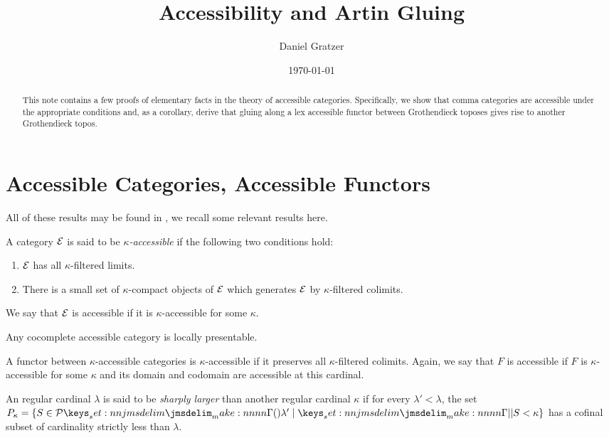\documentclass{amsart}
\title{Accessibility and Artin Gluing}
\author{Daniel Gratzer}
\date{\today}
\begin{document}
\begin{abstract}
  This note contains a few proofs of elementary facts in the theory of accessible
  categories. Specifically, we show that comma categories are accessible under the appropriate
  conditions and, as a corollary, derive that gluing along a lex accessible functor between
  Grothendieck toposes gives rise to another Grothendieck topos.
\end{abstract}

\maketitle

\section{Accessible Categories, Accessible Functors}
\label{sec:accessible}

All of these results may be found in \textcite{adamek-rosicky:1994}, we recall some relevant
results here.

\begin{definition}
  \label{def:accessible:accessible-category}
  A category $\mathcal{E}$ is said to be \emph{$\kappa$-accessible} if the following two conditions hold:
  \begin{enumerate}
  \item $\mathcal{E}$ has all $\kappa$-filtered limits.
  \item There is a small set of $\kappa$-compact objects of $\mathcal{E}$ which generates $\mathcal{E}$ by
    $\kappa$-filtered colimits.
  \end{enumerate}
  We say that $\mathcal{E}$ is accessible if it is $\kappa$-accessible for some $\kappa$.
\end{definition}

\begin{lemma}
  Any cocomplete accessible category is locally presentable.
\end{lemma}

\begin{definition}
  \label{def:accessible-accessible-functor}
  A functor between $\kappa$-accessible categories is $\kappa$-accessible if it preserves all
  $\kappa$-filtered colimits. Again, we say that $F$ is accessible if $F$ is $\kappa$-accessible for
  some $\kappa$ and its domain and codomain are accessible at this cardinal.
\end{definition}

\begin{definition}
  \label{def:accessible:sharply-larger}
  An regular cardinal $\lambda$ is said to be \emph{sharply larger} than another regular cardinal
  $\kappa$ if for every $\lambda' < \lambda$, the set
  $P_{\kappa} = \{S \in \Pow{\lambda'} \mid \verts{S} < \kappa\}$ has a cofinal subset of
  cardinality strictly less than $\lambda$.
\end{definition}
\end{document}
